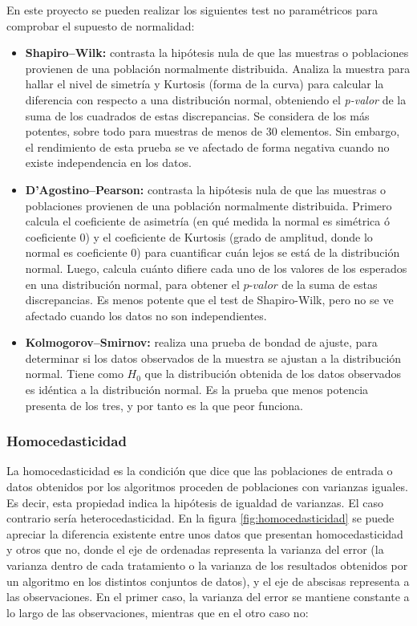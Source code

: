 En este proyecto se pueden realizar los siguientes test no paramétricos para comprobar el supuesto de normalidad:

\begin{itemize}
\item \textbf{Shapiro–Wilk:} contrasta la hipótesis nula de que las muestras o poblaciones provienen de una
población normalmente distribuida. Analiza la muestra para hallar el nivel de simetría y Kurtosis (forma de
la curva) para calcular la diferencia con respecto a una distribución normal, obteniendo el \textit{p-valor} de la suma
de los cuadrados de estas discrepancias. Se considera de los más potentes, sobre todo para muestras de menos
de 30 elementos. Sin embargo, el rendimiento de esta prueba se ve afectado de forma negativa cuando no existe
independencia en los datos.
\item \textbf{D’Agostino–Pearson:} contrasta la hipótesis nula de que las muestras o poblaciones provienen de
una población normalmente distribuida. Primero calcula el coeficiente de asimetría (en qué medida la normal es
simétrica ó coeficiente 0) y el coeficiente de Kurtosis (grado de amplitud, donde lo normal es coeficiente 0) para
cuantificar cuán lejos se está de la distribución normal. Luego, calcula cuánto difiere cada uno de los valores
de los esperados en una distribución normal, para obtener el $\textit{p-valor}$ de la suma de estas discrepancias.
Es menos potente que el test de Shapiro-Wilk, pero no se ve afectado cuando los datos no son independientes.
\item \textbf{Kolmogorov–Smirnov:} realiza una prueba de bondad de ajuste, para determinar si los datos observados
de la muestra se ajustan a la distribución normal. Tiene como $H_0$ que la distribución obtenida de los datos
observados es idéntica a la distribución normal. Es la prueba que menos potencia presenta de los tres, y por tanto
es la que peor funciona.
\end{itemize}

\subsubsection{Homocedasticidad}
La homocedasticidad es la condición que dice que las poblaciones de entrada o datos obtenidos por los algoritmos
proceden de poblaciones con varianzas iguales. Es decir, esta propiedad indica la hipótesis de igualdad de
varianzas. El caso contrario sería heterocedasticidad. En la figura \ref{fig:homocedasticidad} se puede apreciar
la diferencia existente entre unos datos que presentan homocedasticidad y otros que no, donde el eje de ordenadas
representa la varianza del error (la varianza dentro de cada tratamiento o la varianza de los resultados obtenidos
por un algoritmo en los distintos conjuntos de datos), y el eje de abscisas representa a las observaciones. En el
primer caso, la varianza del error se mantiene constante a lo largo de las observaciones, mientras que en el otro
caso no:

